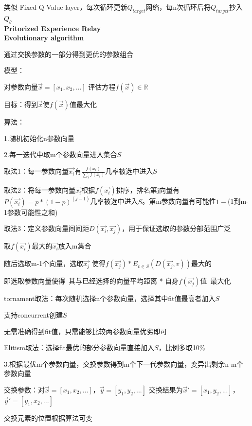 \documentclass[UTF8]{ctexart}
\begin{document}
  类似 Fixed Q-Value layer，每次循环更新$Q_{target}$网络，每n次循环后将$Q_{target}$抄入$Q_{\theta}$\\
\textbf{Pritorized Experience Relay}\\
\textbf{Evolutionary algorithm}

  通过交换参数的一部分得到更优的参数组合

  模型：

  \quad 对参数向量$\vec{x} = [x_1, x_2, ...]$ 评估方程$f(\vec{x}) \in \mathbb{R} $

  目标：得到$\vec{x}$使$f(\vec{x})$值最大化

  算法：

  \quad 1.随机初始化n参数向量

  \quad 2.每一迭代中取m个参数向量进入集合$S$

  \quad \quad 取法1：每一参数向量$\vec{x_i}$有$\frac{f(x_i)}{\sum_i f(x_i)}$几率被选中进入$S$

  \quad \quad 取法2：将每一参数向量$\vec{x_i}$根据$f(\vec{x_i})$排序，排名第j向量有$P(\vec{x_i}) = p * (1-p)^(j-1)$几率被选中进入$S$。第m参数向量有可能性$1-$(1到m-1参数可能性之和)

  \quad \quad 取法3：定义参数向量间间距$D(\vec{x_i}, \vec{x_j})$，用于保证选取的参数分部范围广泛

  \quad \quad \quad 取$f(\vec{x_i})$最大的$\vec{x_i}$放入m集合

  \quad \quad \quad 随后选取m-1个向量，选取$\vec{x_j}$ 使得$f(\vec{x_j}) * E_{v \in S}(D(\vec{x_j}, v))$最大的

  \quad \quad \quad 即选取参数向量使得\ 其与已经选择的向量平均距离 * 自身$f(\vec{x_j})$值\ 最大化

  \quad \quad tornament取法：每次随机选择n个参数向量，选择其中fit值最高者加入$S$

  \quad \quad \quad 支持concurrent创建$S$

  \quad \quad \quad 无需准确得到fit值，只需能够比较两参数向量优劣即可

  \quad \quad Elitism取法：选择fit最优的部分参数向量直接加入$S$，比例多取10\%

  \quad \quad \quad 

  \quad 3.根据最优m个参数向量，交换参数得到m个下一代参数向量，变异出剩余n-m个参数向量

  \quad \quad 交换参数：对$\vec{x} = [x_1, x_2, ...]$，$\vec{y} = [y_1, y_2, ...]$ 交换结果为$\vec{x}' = [x_1, y_2, ...]$，$\vec{y}' = [y_1, x_2, ...]$

  \quad \quad \quad 交换元素的位置根据算法可变
\end{document}
